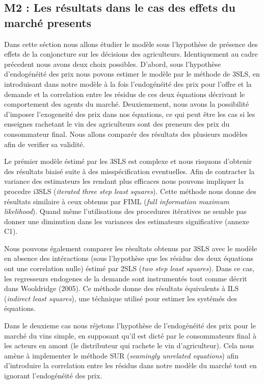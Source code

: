\documentclass[11pt,]{article}
\begin{document}
\hypertarget{m2-les-resultats-dans-le-cas-des-effets-du-marche-presents}{%
\subsection{M2 : Les résultats dans le cas des effets du marché
presents}\label{m2-les-resultats-dans-le-cas-des-effets-du-marche-presents}}

Dans cette séction nous allons étudier le modèle sous l'hypothèse de
présence des effets de la conjoncture sur les décisions des
agriculteurs. Identiquement au cadre précedent nous avons deux choix
possibles. D'abord, sous l'hypothèse d'endogénéité des prix nous povons
estimer le modèle par le méthode de 3SLS, en introduisant dans notre
modèle à la fois l'endogénéité des prix pour l'offre et la demande et la
correlation entre les résidus de ces deux équations décrivant le
comportement des agents du marché. Deuxiemement, nous avons la
possibilité d'imposer l'exogeneité des prix dans nos équations, ce qui
peut être les cas si les enseignes rachetant le vin des agriculteurs
sont des preneurs des prix du consommateur final. Nous allons comparér
des résultats des plusieurs modèles afin de verifier sa validité.

Le prémier modèle éstimé par les 3SLS est complexe et nous risquons
d'obtenir des résultats biaisé suite à des misspécification eventuelles.
Afin de contracter la variance des estimateurs les rendant plus
efficaces nous pouvons impliquer la procedre i3SLS (\emph{iterated three
step least squares}). Cette méthode nous donne des résultats similaire à
ceux obtenus par FIML (\emph{full information maximum likelihood}).
Quand même l'utilisations des procedures itératives ne semble pas donner
une diminution dans les variances des estimateurs significative (annexe
C1).

Nous pouvons également comparer les résultats obtenus par 3SLS avec le
modèle en absence des intéractions (sous l'hypothèse que les résidus des
deux équations ont une correlation nulle) éstimé par 2SLS (\emph{two
step least squares}). Dans ce cas, les regresseurs endogenes de la
demande sont instrumentés tout comme décrit dans Wooldridge (2005). Ce
méthode donne des résultats équivalents à ILS (\emph{indirect least
squares}), une téchnique utilisé pour estimer les systémés des
équations.

Dans le deuxieme cas nous réjetons l'hypothèse de l'endogénéité des prix
pour le marché du vins simple, en supposant qu'il est dicté par le
consommateurs final à les acteurs en amont (le distributeur qui rachete
le vin d'agriculteur). Cela nous amène à implementer le méthode SUR
(\emph{seamingly unrelated equations}) afin d'introduire la correlation
entre les résidus dans notre modèle du marché tout en ignorant
l'endogénéité des prix.
\end{document}
